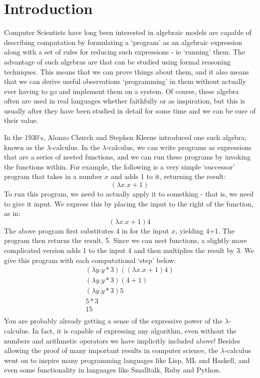 \chapter{Introduction}
	Computer Scientists have long been interested in algebraic models are capable of describing computation by formulating a `program' as an algebraic expression along with a set of rules for reducing such expressions - ie `running' them.  The advantage of such algebras are that can be studied using formal reasoning techniques.  This means that we can prove things about them, and it also means that we can derive useful observations `programming' in them without actually ever having to go and implement them on a system.  Of course, these algebra often are used in real languages whether faithfully or as inspiration, but this is usually after they have been studied in detail for some time and we can be sure of their value.
	
	In the 1930's, Alonzo Church and Stephen Kleene introduced one such algebra, known as the $\lambda$-calculus.  In the $\lambda$-calculus, we can write programs as expressions that are a series of nested functions, and we can run these programs by invoking the functions within.  For example, the following is a very simple `successor' program that takes in a number $x$ and adds 1 to it, returning the result:
	\[
		(\lambda x. x + 1)
	\]
To run this program, we need to actually apply it to something - that is, we need to give it input.  We express this by placing the input to the right of the function, as in:
\[
	(\lambda x. x + 1) 4
\]
The above program first substitutes 4 in for the input $x$, yielding 4+1.  The program then returns the result, 5.  Since we can nest functions, a slightly more complicated version adds 1 to the input 4 and then multiplies the result by 3.  We give this program with each computational `step' below:
\begin{align*}
	(\lambda y. y * 3) ((\lambda x. x + 1) 4)\\
	(\lambda y. y * 3) (4+1)\\
	(\lambda y. y * 3) 5\\
	5 * 3\\
	15\\
\end{align*}
You are probably already getting a sense of the expressive power of the $\lambda$-calculus.  In fact, it is capable of expressing any algorithm, even without the numbers and arithmetic operators we have implicitly included above!  Besides allowing the proof of many important results in computer science, the $\lambda$-calculus went on to inspire many programming languages like Lisp, ML and Haskell, and even some functionality in languages like Smalltalk, Ruby and Python.

